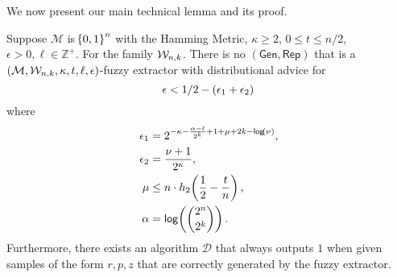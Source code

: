 \noindent
We now present our main technical lemma and its proof. 
\begin{lemma}
\label{lem:convert distinguisher}
    Suppose $\mathcal{M}$ is $\!\left\{ 0,1 \right\}^{n}$ with the Hamming Metric, $\kappa \geq 2$, $0 \leq t \leq n/2$, $\epsilon > 0, \ell\in\mathbb{Z}^+$. For the family $\mathcal{W}_{n,k}$.
    There is no $(\mathsf{Gen, Rep})$ that is a $(\mathcal{M},\mathcal{W}_{n,k},\kappa, t, \ell, \epsilon)$-fuzzy extractor with distributional advice for
\[
\epsilon<1/2-\left(\epsilon_1+\epsilon_2\right)\\
\]
where 
\begin{align*}
\epsilon_1&= 2^{-\kappa-\frac{\alpha-\ell}{2^k}+1+\mu+2k-\mathsf{log}\!\left(\nu\right)},\\
\epsilon_2&=\frac{\nu+1}{2^{\kappa}},\\
  \mu &\leq n \cdot h_2\!\left(\frac{1}{2} - \frac{t}{n}\right),\\
\alpha &= \mathsf{log}\!\left({2^n\choose 2^k}\right).
\end{align*}
Furthermore, there exists an algorithm $\mathcal{D}$ that always outputs $1$ when given samples of the form $r, p, z$ that are correctly generated by the fuzzy extractor.
\end{lemma}

